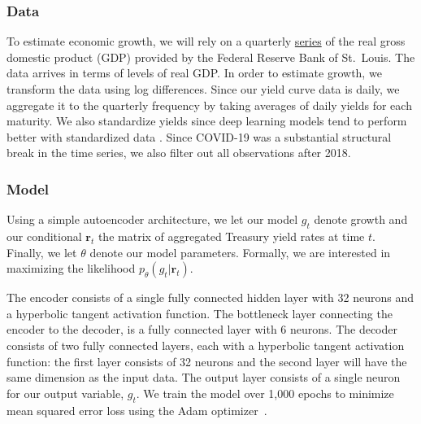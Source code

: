 \documentclass{article}
\theoremstyle{plain}
\theoremstyle{definition}
\theoremstyle{remark}
\begin{document}
\subsubsection{Data}\label{data}

To estimate economic growth, we will rely on a quarterly
\href{https://fred.stlouisfed.org/series/GDPC1}{series} of the real gross domestic product (GDP) provided by the Federal Reserve Bank of St.~Louis. The data arrives in terms of levels of real GDP. In order to estimate growth, we transform the data using log differences. Since
our yield curve data is daily, we aggregate it to the
quarterly frequency by taking averages of daily yields for each maturity. We also standardize yields since deep learning models tend to perform better with standardized data \cite{gal2019standardization}. Since COVID-19 was a substantial structural break in the time series, we also filter out all observations after 2018.

\subsubsection{Model}\label{model}


Using a simple autoencoder architecture, we let our model \(g_t\) denote growth and our conditional \(\mathbf{r}_t\) the matrix of aggregated Treasury yield rates at time \(t\). Finally, we let \(\theta\) denote our model parameters. Formally, we are interested in maximizing the likelihood \(p_{\theta}(g_t|\mathbf{r}_t)\). 

The encoder consists of a single fully connected hidden layer with 32 neurons and a hyperbolic tangent activation function. The bottleneck layer connecting the encoder to the decoder, is a fully connected layer with 6 neurons. The decoder consists of two fully connected layers, each with a hyperbolic tangent activation function: the first layer consists of 32 neurons and the second layer will have the same dimension as the input data. The output layer consists of a single neuron for our output variable, \(g_t\). We train the model over 1,000 epochs to minimize mean squared error loss using the Adam optimizer~\citep{kingma2017adam}.
\end{document}
